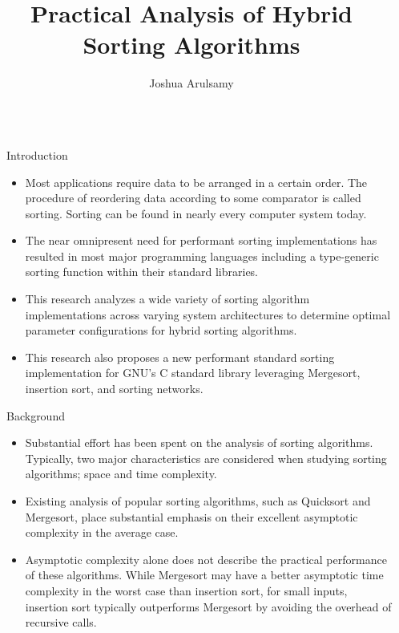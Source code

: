 \documentclass[final]{beamer}
\title{Practical Analysis of Hybrid Sorting Algorithms}
\author{Joshua Arulsamy}
\institute[shortinst]{Department of Electrical Engineering and Computer Science, University of Wyoming}
\newlength{\sepwidth}
\newlength{\colwidth}
\newcommand{\separatorcolumn}{\begin{column}{\sepwidth}\end{column}}
\begin{document}

\begin{frame}[t]
	\begin{columns}[t]
		\separatorcolumn

		\begin{column}{\colwidth}

			\begin{block}{Introduction}
				\begin{itemize}
					\item Most applications require data to be arranged in a certain order.
					      The procedure of reordering data according to some comparator is
					      called sorting. Sorting can be found in nearly every computer
					      system today.
					\item The near omnipresent need for
					      performant sorting implementations has resulted in most major
					      programming languages including a type-generic sorting function
					      within their standard libraries.
					\item This research analyzes a wide variety of sorting
					      algorithm implementations across varying system architectures to
					      determine optimal parameter configurations for hybrid sorting
					      algorithms.
					\item This research also proposes a new performant standard
					      sorting implementation for GNU's C standard library leveraging
					      Mergesort, insertion sort, and sorting networks.
				\end{itemize}
			\end{block}

			\begin{block}{Background}
				\begin{itemize}
					\item Substantial effort has been spent on the analysis of
					      sorting algorithms. Typically, two major characteristics
					      are considered when studying sorting algorithms; space
					      and time complexity.
					\item Existing analysis of popular sorting algorithms, such as Quicksort
					      and Mergesort, place substantial emphasis on their excellent
					      asymptotic complexity in the average case\parencite{glibc}.
					\item Asymptotic complexity alone does not describe the
					      practical performance of these algorithms. While Mergesort may
					      have a better asymptotic time complexity in the worst case than
					      insertion sort, for small inputs, insertion sort typically
					      outperforms Mergesort by avoiding the overhead of recursive calls.
				\end{itemize}
			\end{block}


\end{column}
\end{columns}
\end{frame}
\end{document}

